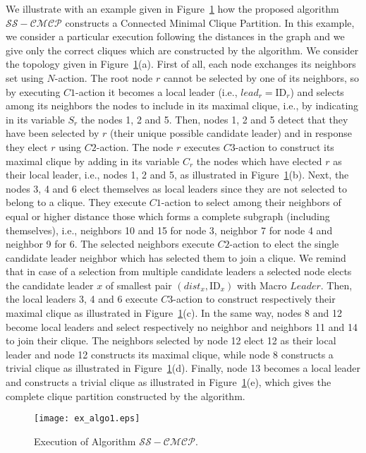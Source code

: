 \documentclass[11pt,letterpaper,onecolumn]{article}
\newcommand{\id}{\mbox{ID}}
\begin{document}
We illustrate with an example given in Figure~\ref{fig:ex_algo1} how the proposed algorithm $\mathcal{SS-CMCP}$ constructs a Connected Minimal Clique Partition. In this example, we consider a particular execution following the distances in the graph and we give only the correct cliques which are constructed by the algorithm. We consider the topology given in Figure~\ref{fig:ex_algo1}(a). First of all, each node exchanges its neighbors set using $N$-action. The root node $r$ cannot be selected by one of its neighbors, so by executing $C1$-action it becomes a local leader (i.e., $lead_r= \id_r$) and selects among its neighbors the nodes to include in its maximal clique, i.e., by indicating in its variable $S_r$ the nodes 1, 2 and 5. Then, nodes 1, 2 and 5 detect that they have been selected by $r$ (their unique possible candidate leader) and in response they elect $r$ using $C2$-action. The node $r$ executes $C3$-action to construct its maximal clique by adding in its variable $C_r$ the nodes which have elected $r$ as their local leader, i.e., nodes 1, 2 and 5, as illustrated in Figure~\ref{fig:ex_algo1}(b). Next, the nodes 3, 4 and 6 elect themselves as local leaders since they are not selected to belong to a clique. They execute $C1$-action to select among their neighbors of equal or higher distance those which forms a complete subgraph (including themselves), i.e., neighbors 10 and 15 for node 3, neighbor 7 for node 4 and neighbor 9 for 6. The selected neighbors execute $C2$-action to elect the single candidate leader neighbor which has selected them to join a clique. We remind that in case of a selection from multiple candidate leaders a selected node elects the candidate leader $x$ of smallest pair $(dist_x, \id_x)$ with Macro $Leader$. Then, the local leaders 3, 4 and 6 execute $C3$-action to construct respectively their maximal clique as illustrated in Figure~\ref{fig:ex_algo1}(c). In the same way, nodes 8 and 12 become local leaders and select respectively no neighbor and neighbors 11 and 14 to join their clique. The neighbors selected by node 12 elect 12 as their local leader and node 12 constructs its maximal clique, while node 8 constructs a trivial clique as illustrated in Figure~\ref{fig:ex_algo1}(d). Finally, node 13 becomes a local leader and constructs a trivial clique as illustrated in Figure~\ref{fig:ex_algo1}(e), which gives the complete clique partition constructed by the algorithm.

\begin{figure}[!ht]
\begin{center}
\texttt{[image: ex\_algo1.eps]}
\end{center}
\caption{Execution of Algorithm $\mathcal{SS-CMCP}$.}
\label{fig:ex_algo1}
\end{figure}
\end{document}
